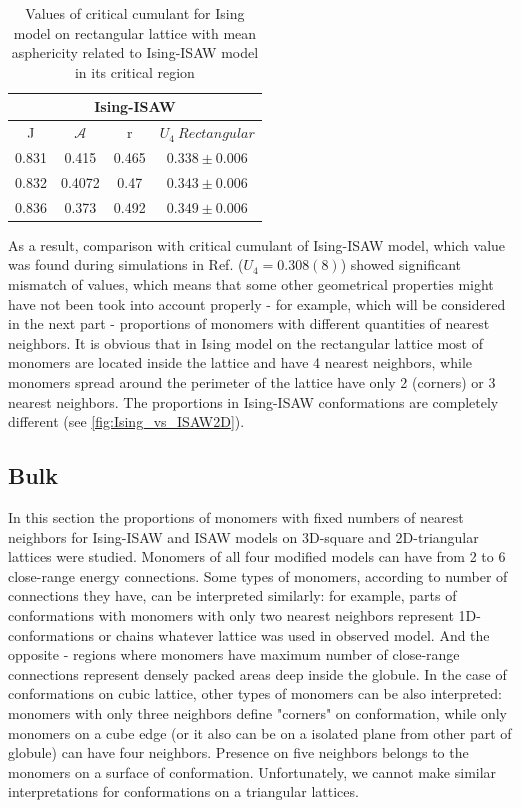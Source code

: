 \begin{table}[h]
    \centering
    \begin{tabular}{|c|c|c|c|}
        \hline
         \multicolumn{4}{|c|}{Ising-ISAW}  \\ \hline
         J & $\mathcal{A}$ & r & $U_{4}\  Rectangular$ \\ \hline
         0.831 & 0.415 & 0.465 & $0.338 \pm 0.006$\\ \hline
         0.832 & 0.4072 & 0.47 & $0.343 \pm 0.006$\\ \hline
         0.836 & 0.373 & 0.492 & $0.349 \pm 0.006$\\ \hline
         \end{tabular}
    \medskip
    \caption{Values of critical cumulant for Ising model on rectangular lattice with mean asphericity related to Ising-ISAW model in its critical region}
    \label{tab:A_r_U}
\end{table}


As a result, comparison with critical cumulant of Ising-ISAW model, which value was found during simulations in Ref.\cite{faizullina2021critical} ($U_{4} = 0.308(8)$) showed significant mismatch of values, which means that some other geometrical properties might have not been took into account properly - for example, which will be considered in the next part - proportions of monomers with different quantities of nearest neighbors. It is obvious that in Ising model on the rectangular lattice most of monomers are located inside the lattice and have 4 nearest neighbors, while monomers spread around the perimeter of the lattice have only 2 (corners) or 3 nearest neighbors. The proportions in Ising-ISAW conformations are completely different (see \cref{fig:Ising_vs_ISAW2D}).



\subsection{Bulk}

In this section the proportions of monomers with fixed numbers of nearest neighbors for Ising-ISAW and ISAW models on 3D-square and 2D-triangular lattices were studied. 
Monomers of all four modified models can have from 2 to 6 close-range energy connections. 
Some types of monomers, according to number of connections they have, can be interpreted similarly: for example, parts of conformations with monomers with only two nearest neighbors represent 1D-conformations or chains whatever lattice was used in observed model. 
And the opposite - regions where monomers have maximum number of close-range connections represent densely packed areas deep inside the globule. 
In the case of conformations on cubic lattice, other types of monomers can be also interpreted: monomers with only three neighbors define "corners" on conformation, while only monomers on a cube edge (or it also can be on a isolated plane from other part of globule) can have four neighbors. 
Presence on five neighbors belongs to the monomers on a surface of conformation. 
Unfortunately, we cannot make similar interpretations for conformations on a triangular lattices.


